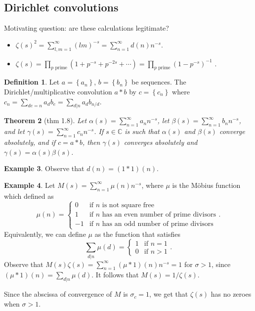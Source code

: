 \documentclass[11pt]{article}
\newtheorem{thm}{Theorem}[subsection]
\theoremstyle{definition}
\newtheorem{defn}[thm]{Definition}
\newtheorem{example}[thm]{Example}
\newcommand{\set}[1]{\left\{ #1 \right\}}
\newcommand{\s}[0]{\sigma}
\newcommand{\CC}{\mathbb{C}}
\begin{document}
\subsection{Dirichlet convolutions}

Motivating question: are these calculations legitimate?
\begin{itemize}
\item $\zeta(s)^2 = \sum_{l,m=1}^\infty (lm)^{-s} = \sum_{n=1}^\infty d(n)n^{-s}$.
\item $\zeta(s) = \prod_{p\text{ prime}}(1+p^{-s}+p^{-2s}+\cdots) = \prod_{p\text{ prime}}
(1-p^{-s})^{-1}$ .
\end{itemize}

\begin{defn}
  Let $a=\set{a_n}$, $b=\set{b_n}$ be sequences. The Dirichlet/multiplicative convolution
  $a*b$ by $c=\set{c_n}$ where $c_n = \sum_{de=n}a_db_e = \sum_{d|n}a_db_{n/d}$.
\end{defn}

\begin{thm}[thm 1.8]\label{thm:1.8}
Let $\alpha(s)=\sum_{n=1}^\infty a_nn^{-s}$, let $\beta(s)=\sum_{n=1}^\infty b_nn^{-s}$,
and let $\gamma(s)=\sum_{n=1}^\infty c_nn^{-s}$. If $s\in\CC$ is such that $\alpha(s)$ and
$\beta(s)$ converge absolutely, and if $c=a*b$, then $\gamma(s)$ converges absolutely and
$\gamma(s)=\alpha(s)\beta(s)$.
\end{thm}

\begin{example}
Observe that $d(n)=(1*1)(n)$.
\end{example}

\begin{example}
Let $M(s)=\sum_{n=1}^\infty\mu(n)n^{-s}$, where $\mu$ is the M\"obius function which
defined as
\[
  \mu(n) = \begin{cases}
  0 &\text{if } n \text{ is not square free} \\
  1 &\text{if } n \text{ has an even number of prime divisors} \\
  -1 &\text{if } n \text{ has an odd number of prime divisors}
  \end{cases} .
\]
Equivalently, we can define $\mu$ as the function that satisfies
\[
  \sum_{d|n}\mu(d) = \begin{cases}
  1 &\text{if } n = 1 \\
  0 &\text{if } n > 1
  \end{cases} .
\]
Observe that $M(s)\zeta(s) = \sum_{n=1}^\infty(\mu*1)(n)n^{-s} = 1$ for $\s>1$, since
$(\mu*1)(n)=\sum_{d|n}\mu(d)$. It follows that $M(s)=1/\zeta(s)$.

Since the abscissa of convergence of $M$ is $\s_c=1$, we get that $\zeta(s)$ has no zeroes
when $\s>1$.
\end{example}
\end{document}
